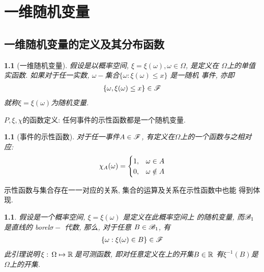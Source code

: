 \chapter{一维随机变量}

\section{一维随机变量的定义及其分布函数}

\newtheorem{one_dimensional_random_variable}[theorem_root]{}
\begin{one_dimensional_random_variable}[一维随机变量]
假设\prbsp 是以概率空间, \(\xi = \xi(\omega), \omega\in\Omega\), 是定义在
\(\Omega\)上的单值实函数. 如果对于任一实数, \(\omega-\)集合\(\{\omega: \xi(\omega)\le x\}\) 是一随机
事件, 亦即
\begin{align}
    \{\omega, \xi(\omega) \le x\}\in\msF
\end{align}
就称\(\xi = \xi(\omega)\)为随机变量.
\end{one_dimensional_random_variable}

\medskip
\noindent\(P, \xi, \chi\)的函数定义:
任何事件的示性函数都是一个随机变量.

\newtheorem{indictive_function}[theorem_root]{}
\begin{indictive_function}[事件的示性函数]
对于任一事件\(A\in\msF\), 有定义在\(\Omega\)上的一个函数与之相对应:
\begin{align}
    \chi_A(\omega) = \begin{cases}
        1, & \omega\in A\cr
        0, & \omega\notin A\cr
    \end{cases}
\end{align}
\end{indictive_function}

示性函数与集合存在一一对应的关系, 集合的运算及关系在示性函数中也能
得到体现.

\newtheorem{about_probability_variable_and_the_event}[theorem_root]{\lemma}
\begin{about_probability_variable_and_the_event}
    假设\prbsp 是一个概率空间, \(\xi = \xi(\omega)\) 是定义在此概率空间上
    的随机变量, 而\(\msB_1\)是直线的 borel\(\sigma-\) 代数, 那么, 对于任意
    \(B\in \msB_1\), 有
    \begin{align}
    \{\omega: \xi(\omega)\in B\}\in\msF
    \end{align}
此引理说明\(\,\xi:\,\Omega\mapsto \Rs\,\)是可测函数, 即对任意定义在\Rs 上的开集\(B\in\Rs\)
有\(\xi^{-1}(B)\)是\(\Omega\)上的开集.
\end{about_probability_variable_and_the_event}

